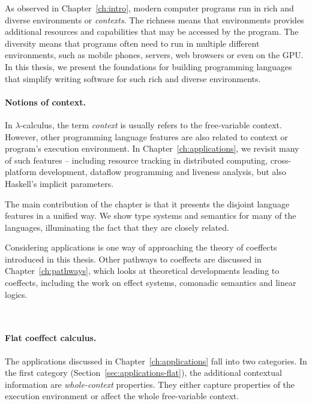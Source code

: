 As observed in Chapter~\ref{ch:intro}, modern computer programs run in rich and diverse environments
or \emph{contexts}. The richness means that environments provides additional resources and
capabilities that may be accessed by the program. The diversity means that programs often need to
run in multiple different environments, such as mobile phones, servers, web browsers or even on the
GPU. In this thesis, we present the foundations for building programming languages that simplify
writing software for such rich and diverse environments.


\paragraph{Notions of context.}

In $\lambda$-calculus, the term \emph{context} is usually refers to the free-variable context.
However, other programming language features are also related to context or program's
execution environment. In Chapter~\ref{ch:applications}, we revisit many of such features --
including resource tracking in distributed computing, cross-platform development, dataflow
programming and liveness analysis, but also Haskell's implicit parameters.

The main contribution of the chapter is that it presents the disjoint language features in a
unified way. We show type systems and semantics for many of the languages, illuminating
the fact that they are closely related.

Considering applications is one way of approaching the theory of coeffects introduced in this thesis.
Other pathways to coeffects are discussed in Chapter~\ref{ch:pathways}, which looks at theoretical
developments leading to coeffects, including the work on effect systems, comonadic semantics and
linear logics.

~

\paragraph{Flat coeffect calculus.}

The applications discussed in Chapter~\ref{ch:applications} fall into two categories. In the first
category (Section~\ref{sec:applications-flat}), the additional contextual information are
\emph{whole-context} properties. They either capture properties of the execution environment or
affect the whole free-variable context.

